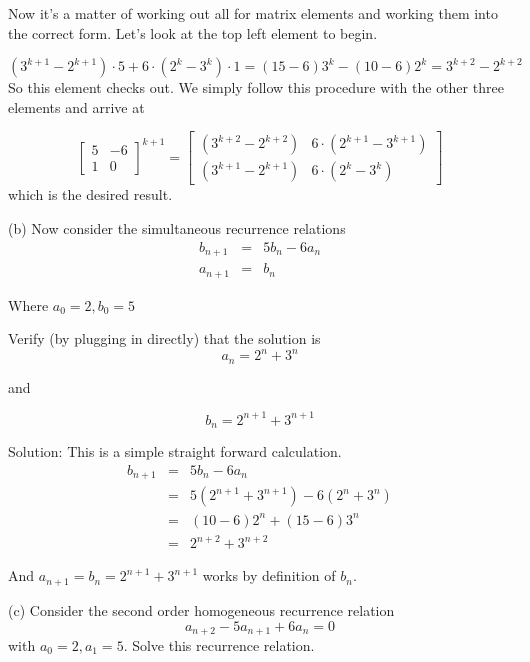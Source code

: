 \documentclass[16 pt]{amsart}
\theoremstyle{definition}
\theoremstyle{remark}
\numberwithin{equation}{subsection}
\begin{document}
Now it's a matter of working out all for matrix elements and working them into the correct form.  Let's look at the top left element to begin.

\[
(3^{k+1}-2^{k+1})\cdot 5 + 6\cdot(2^k-3^k)\cdot 1 = (15-6)3^k - (10-6)2^k = 3^{k+2}-2^{k+2}
\]
So this element checks out.  We simply follow this procedure with the other three elements and arrive at


\[
\begin{bmatrix}
5 & -6 \\
1 & 0
\end{bmatrix}^{k+1} = 
\begin{bmatrix}
(3^{k+2}-2^{k+2}) & 6\cdot(2^{k+1}- 3^{k+1}) \\
(3^{k+1}-2^{k+1}) & 6\cdot(2^{k}-3^{k})\end{bmatrix}
\]
which is the desired result.

\vspace{.5in}

(b) Now consider the simultaneous recurrence relations
\begin{eqnarray*}
b_{n+1} & = & 5b_n -6 a_n\\
a_{n+1} & = & b_n
\end{eqnarray*}

Where $a_0 =2, b_0 = 5$

Verify (by plugging in directly) that the solution is
\[
a_n = 2^n+ 3^n
\]
\begin{center}
and
\end{center}
\[
b_n = 2^{n+1}+ 3^{n+1}
\]

\vspace{.5in}

Solution: This is a simple straight forward calculation.
\begin{eqnarray*}
b_{n+1} &=& 5 b_n - 6 a_n\\ 
&=& 5(2^{n+1}+3^{n+1}) - 6(2^n + 3^n)\\
&=& (10-6)2^n + (15-6)3^n\\
&=& 2^{n+2} + 3^{n+2}  
\end{eqnarray*}

And $a_{n+1} = b_n = 2^{n+1}+3^{n+1}$ works by definition of $b_n$.



\vspace{.5in}

(c) Consider the second order homogeneous recurrence relation
\[
a_{n+2} - 5 a_{n+1} + 6a_n =0
\]
with $a_0 =2, a_1=5$.  Solve this recurrence relation.
\end{document}
